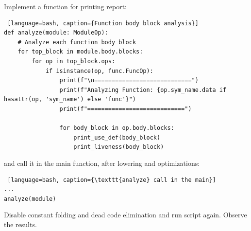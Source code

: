 \documentclass[../main.tex]{subfiles}
\begin{document}
Implement a function for printing report:
\begin{lstlisting} [language=bash, caption={Function body block analysis}]
def analyze(module: ModuleOp):
    # Analyze each function body block
    for top_block in module.body.blocks:
        for op in top_block.ops:
            if isinstance(op, func.FuncOp):
                print(f"\n============================")
                print(f"Analyzing Function: {op.sym_name.data if hasattr(op, 'sym_name') else 'func'}")
                print(f"============================")

                for body_block in op.body.blocks:
                    print_use_def(body_block)
                    print_liveness(body_block)
\end{lstlisting}
and call it in the main function, after lowering and optimizations:
\begin{lstlisting} [language=bash, caption={\texttt{analyze} call in the main}]
...
analyze(module)
\end{lstlisting}
Disable constant folding and dead code elimination and run script again. Observe the results.
\end{document}
